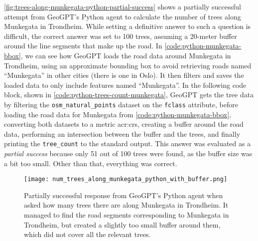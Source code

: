 \autoref{fig:trees-along-munkegata-python-partial-success} shows a partially successful attempt from GeoGPT's Python agent to calculate the number of trees along Munkegata in Trondheim. While setting a definitive answer to such a question is difficult, the correct answer was set to 100 trees, assuming a 20-meter buffer around the line segments that make up the road. In \autoref{code:python-munkegata-bbox}, we can see how GeoGPT loads the road data around Munkegata in Trondheim, using an approximate bounding box to avoid retrieving roads named \enquote{Munkegata} in other cities (there is one in Oslo). It then filters and saves the loaded data to only include features named \enquote{Munkegata}. In the following code block, shown in \autoref{code:python-trees-count-munkegata}, GeoGPT gets the tree data by filtering the \texttt{osm\_natural\_points} dataset on the \texttt{fclass} attribute, before loading the road data for Munkegata from \autoref{code:python-munkegata-bbox}, converting both datasets to a metric \acrshort{acr:crs}, creating a buffer around the road data, performing an intersection between the buffer and the trees, and finally printing the \texttt{tree\_count} to the standard output. This answer was evaluated as a \textit{partial success} because only 51 out of 100 trees were found, as the buffer size was a bit too small.
Other than that, everything was correct.

\begin{figure}[htbp]
    \centering
    \texttt{[image: num\_trees\_along\_munkegata\_python\_with\_buffer.png]}
    \caption[Partially successful response from GeoGPT's Python agent when asked how many trees there are along Munkegata in Trondheim]{Partially successful response from GeoGPT's Python agent when asked how many trees there are along Munkegata in Trondheim. It managed to find the road segments corresponding to Munkegata in Trondheim, but created a slightly too small buffer around them, which did not cover all the relevant trees.}
    \label{fig:trees-along-munkegata-python-partial-success}
\end{figure}

\FloatBarrier


